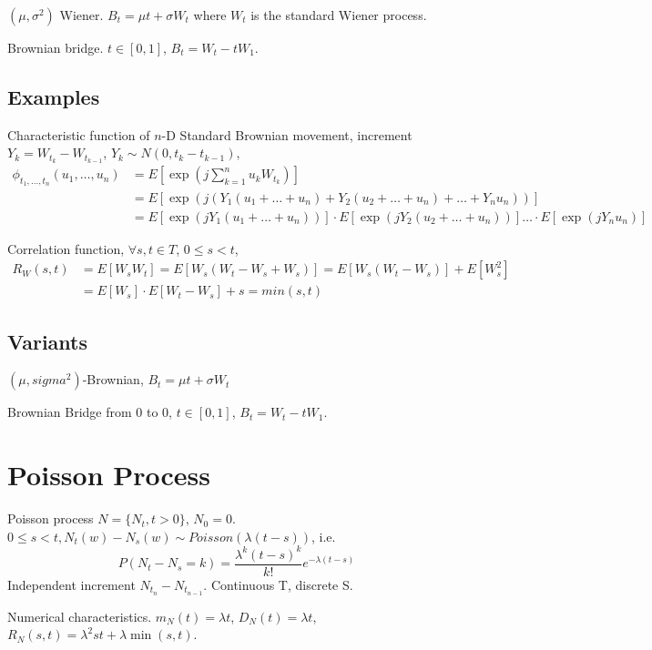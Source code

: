 $(\mu,\sigma^2)$ Wiener. $B_t = \mu t + \sigma W_t$ where $W_t$ is the standard
Wiener process.

Brownian bridge. $t\in [0,1]$, $B_t = W_t - tW_1$.

\subsection{Examples}

Characteristic function of $n$-D Standard Brownian movement, increment
$Y_k = W_{t_k} - W_{t_{k-1}}$, $Y_k \sim N(0,t_k - t_{k-1})$,
\begin{align}
	\phi_{t_1,\ldots,t_n}(u_1,\ldots,u_n)
	&= E[\exp(j\sum_{k=1}^n u_k W_{t_k})]\\
	&= E[\exp(j(Y_1(u_1+\ldots+u_n) + Y_2(u_2+\ldots+u_n)+ \ldots + Y_nu_n))]\\
	&= E[\exp(jY_1(u_1+\ldots+u_n))]\cdot E[\exp(jY_2(u_2+\ldots+u_n))]\ldots\cdot E[\exp(jY_nu_n)]
\end{align}

Correlation function, $\forall s, t \in T$, $0\leq s < t$,
\begin{align}
	R_W(s,t) &= E[W_sW_t] = E[W_s(W_t - W_s + W_s)] = E[W_s(W_t-W_s)] + E[W_s^2]\\
	&= E[W_s]\cdot E[W_t-W_s] + s = min(s,t)
\end{align}

\subsection{Variants}

$(\mu,sigma^2)$-Brownian, $B_t = \mu t + \sigma W_t$

Brownian Bridge from $0$ to $0$, $t \in [0,1]$, $B_t = W_t - tW_1$.

\section{Poisson Process}

Poisson process $N=\{N_t, t>0\}$, $N_0=0$. $0\leq s< t, N_t(w)-N_s(w)\sim Poisson(\lambda(t-s))$,
i.e. $$P(N_t-N_s=k)=\frac{\lambda^k(t-s)^k}{k!}e^{-\lambda(t-s)}$$ Independent
increment $N_{t_n}-N_{t_{n-1}}$. Continuous T, discrete S.

Numerical characteristics. $m_N(t)=\lambda t$, $D_N(t)=\lambda t$,
$R_N(s,t) = \lambda^2 st + \lambda\min(s,t)$.

